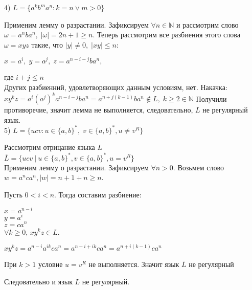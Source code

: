 \documentclass[a4paper,12pt]{article}
\begin{document}
4)  $ L = \{a^{k}b^{m}a^{n} : k = n \vee m > 0\} $

Применим лемму о разрастании. 
Зафиксируем $\forall n \in \mathbb{N} $ 
и рассмотрим слово $\omega = a^nba^n, \; |\omega| = 2n + 1 \geqslant n$. 
Теперь рассмотрим все разбиения этого слова $\omega = xyz$ такие, что $|y| \neq 0, \; |xy| \leq n$:

$ x = a^{i}, \; y = a^{j}, \; z = a^{n-i-j}ba^{n}, $

где $i + j \leqslant n $ \\

Других разбиенний, удовлетворяющих данным условиям, нет.
Накачка:
$ xy^{k}z = a^{i}(a^{j})^{k}a^{n-i-j}ba^{n} = a^{n+j(k-1)}ba^{n} \notin L, \; k 
\geqslant 2 \in \mathbb{N} $
Получили противоречие, значит лемма не выполняется, следовательно, $L$ не регулярный язык. \\



5) $ L = \{ucv : u \in \{a, b\}^*, \; v \in \{a, b\}^*, u \ne v^R \} $

Рассмотрим отрицание языка $L$ \\
$\overline L = \{ ucv \ | \ u \in \{ a,b \}^*, v \in \{ a,b\}^* , u = v^R \}$ \\

Применим лемму о разрастании.
Зафиксируем $\forall n > 0$. 
Возьмем слово $w = a^{n} c a^{n}, |w| = n + 1 + n \geq n$.

Пусть $ 0 < i < n$. Тогда составим разбиение:

$ x = a^{n - i} $ \\
$ y = a^i $ \\
$ z = c a^n $ \\

$\forall k \geq 0$,  $xy^kz \in L$.

$ xy^kz = a^{n - i} a^{ik} c a^n = a^{n - i + ik} c a^n = a^{n + i(k-1)} c a^n $

При $k > 1$ условие $ u = v^R $ не выполняется. Значит язык $\overline L$ не регулярный 

Следовательно и язык $L$ не регулярный.
\end{document}
